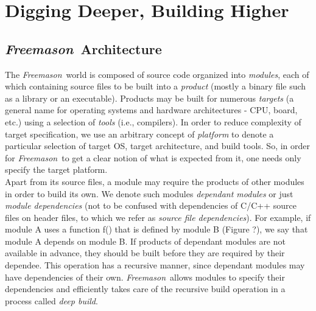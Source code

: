 \documentclass[a4paper]{article}
\newcommand{\freemason}{\textit{Freemason}}
\begin{document}
\clearpage

\part{Digging Deeper, Building Higher}

\chapter{\freemason\ Architecture}

The \freemason\ world is composed of source code organized into \textit{modules}, each of which
containing source files to be built into a \textit{product} (mostly a binary file such as a library or an executable).
Products may be built for numerous \textit{targets} (a general name for operating systems and hardware architectures -
CPU, board, etc.) using a selection of \textit{tools} (i.e., compilers).
In order to reduce complexity of target specification, we use an arbitrary concept of \textit{platform} to
denote a particular selection of target OS, target architecture, and build tools. So, in order for \freemason\ to
get a clear notion of what is expected from it, one needs only specify the target platform.
\\
Apart from its source files, a module may require the products of other modules in order to build its own.
We denote such modules \textit{dependant modules} or just \textit{module dependencies} (not to be confused with dependencies
of C/C++ source files on header files, to which we refer as \textit{source file dependencies}).
For example, if module A uses a function f() that is defined by module B (Figure ?), we say that module A depends on module B.
If products of dependant modules are not available in advance, they should be built before they are required by their dependee.
This operation has a recursive manner, since dependant modules may have dependencies of their own.
\freemason\ allows modules to specify their dependencies and efficiently takes care of the recursive build
operation in a process called \textit{deep build}.
\end{document}
